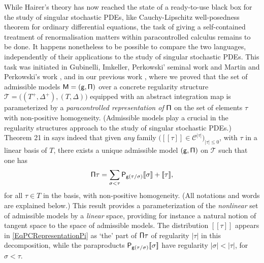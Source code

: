 \documentclass[10pt]{amsart}
\theoremstyle{plain}
\theoremstyle{definition}
\newcommand{\Brac}[1]{[\![#1]\!]}
\newcommand{\scrT}{\mathscr{T}}
\newcommand{\mcC}{\mathcal{C}}
\begin{document}
While Hairer's theory has now reached the state of a ready-to-use black box for the study of singular stochastic PDEs, like Cauchy-Lipschitz well-posedness theorem for ordinary differential equations, the task of giving a self-contained treatment of renormalisation matters within paracontrolled calculus remains to be done. It happens nonetheless to be possible to compare the two languages, independently of their applications to the study of singular stochastic PDEs. This task was initiated in Gubinelli, Imkeller, Perkowski' seminal work \cite{GIP} and Martin and Perkowski's work \cite{MP18}, and in our previous work \cite{BH}, where we proved that the set of admissible models $\sf M=(g,\Pi)$ over a concrete regularity structure $\scrT=\bigl((T^+,\Delta^+), (T,\Delta)\bigr)$ equipped with an abstract integration map is parameterized by a \emph{paracontrolled representation of} $\sf \Pi$ on the set of elements $\tau$ with non-positive homogeneity. (Admissible models play a crucial in the regularity structures approach to the study of singular stochastic PDEs.) Theorem 21 in \cite{BH} says indeed that given \emph{any} family $\bigl(\Brac{\tau}\in\mcC^{\vert\tau\vert}\bigr)_{\vert\tau\vert\leq 0}$, with $\tau$ in a linear basis of $T$, there exists a unique admissible model $\sf (g,\Pi)$ on $\mathscr{T}$ such that one has
\begin{equation} \label{EqPCRepresentationPi}
{\sf \Pi} \tau = \sum_{\sigma<\tau} {\sf P}_{{\sf g}(\tau/\sigma)}\Brac{\sigma} + \Brac{\tau},
\end{equation}
for all $\tau\in T$ in the basis, with non-positive homogeneity. (All notations and words are explained below.) This result provides a parameterization of the \emph{nonlinear} set of admissible models by a \emph{linear} space, providing for instance a natural notion of tangent space to the space of admissible models. The distribution $\Brac{\tau}$ appears in \eqref{EqPCRepresentationPi} as `the' part of ${\sf\Pi}\tau$ of regularity $\vert\tau\vert$ in this decomposition, while the paraproducts ${\sf P}_{{\sf g}(\tau/\sigma)}\Brac{\sigma}$ have regularity $\vert\sigma\vert<\vert\tau\vert$, for $\sigma<\tau$.
\end{document}
